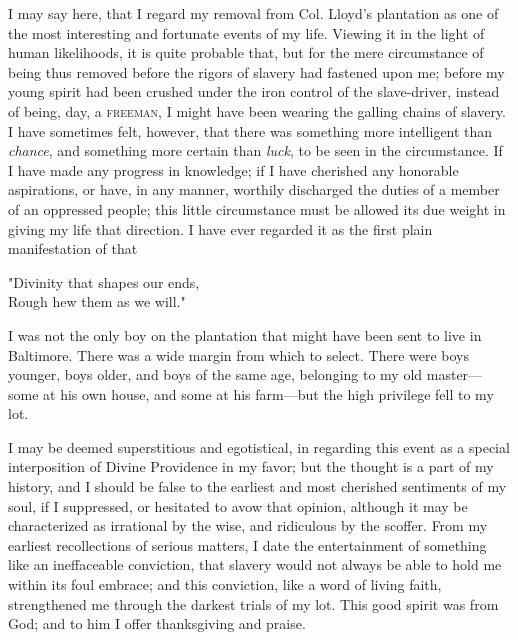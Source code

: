 I may say here, that I regard my removal from Col. Lloyd's plantation as
one of the most interesting and fortunate events of my life. Viewing it
in the light of human likelihoods, it is quite probable that, but for
the mere circumstance of being thus removed before the rigors of slavery
had fastened upon me; before my young spirit had been crushed under the
iron control of the slave-driver, instead of being,
{\protect\hypertarget{139}{}{}}day, a \textsc{freeman}, I might have
been wearing the galling chains of slavery. I have sometimes felt,
however, that there was something more intelligent than \emph{chance},
and something more certain than \emph{luck}, to be seen in the
circumstance. If I have made any progress in knowledge; if I have
cherished any honorable aspirations, or have, in any manner, worthily
discharged the duties of a member of an oppressed people; this little
circumstance must be allowed its due weight in giving my life that
direction. I have ever regarded it as the first plain manifestation of
that

"Divinity that shapes our ends,\\
Rough hew them as we will."

I was not the only boy on the plantation that might have been sent to
live in Baltimore. There was a wide margin from which to select. There
were boys younger, boys older, and boys of the same age, belonging to my
old master---some at his own house, and some at his farm---but the high
privilege fell to my lot.

I may be deemed superstitious and egotistical, in regarding this event
as a special interposition of Divine Providence in my favor; but the
thought is a part of my history, and I should be false to the earliest
and most cherished sentiments of my soul, if I suppressed, or hesitated
to avow that opinion, although it may be characterized as irrational by
the wise, and ridiculous by the scoffer. From my earliest recollections
of serious matters, I date the entertainment of something like an
ineffaceable conviction, that slavery would not always be able to
{\protect\hypertarget{140}{}{}}hold me within its foul embrace; and this
conviction, like a word of living faith, strengthened me through the
darkest trials of my lot. This good spirit was from God; and to him I
offer thanksgiving and praise.
